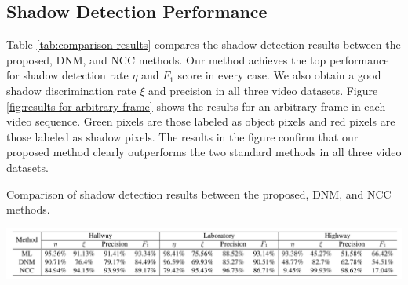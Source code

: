 \subsection{Shadow Detection Performance}

Table \ref{tab:comparison-results} compares the shadow detection
results between the proposed, DNM, and NCC methods.  Our method
achieves the top performance for shadow detection rate $\eta$ and
$F_1$ score in every case. We also obtain a good shadow discrimination
rate $\xi$ and precision in all three video
datasets. Figure \ref{fig:results-for-arbitrary-frame} shows the
results for an arbitrary frame in each video sequence. Green pixels
are those labeled as object pixels and red pixels are those labeled as
shadow pixels. The results in the figure confirm that our proposed
method clearly outperforms the two standard methods in all three video
datasets.

\begin{table}[t]
  \caption[Comparison of shadow detection results between the
    proposed, DNM, and NCC methods.]{\small Comparison of shadow
    detection results between the proposed, DNM, and NCC methods.}
  \begin{center}
    \includegraphics[width=6.1in]{figures/tab-shadow-results}
  \end{center}
  \label{tab:comparison-results}
\end{table}

